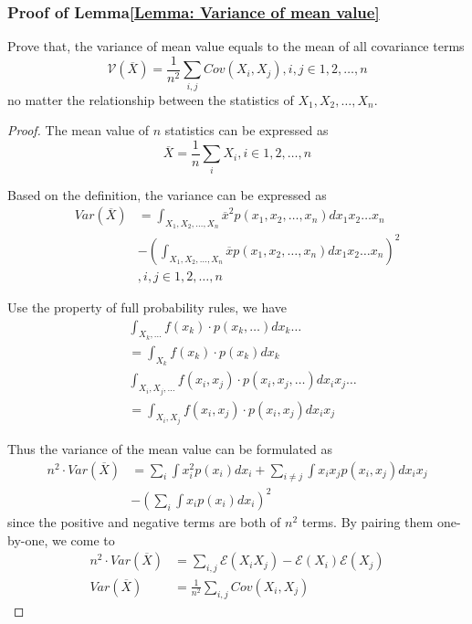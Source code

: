 \documentclass[../main.tex]{subfiles}
\begin{document}
\begin{subappendices}
    \subsubsection{Proof of Lemma\ref{Lemma: Variance of mean value}}
    Prove that, the variance of mean value equals to the mean of all covariance terms
    \begin{equation*}
        \mathcal{V}(\overline{X}) =
        \frac{1}{n^2} \sum_{i, j} Cov(X_i, X_j),
        i, j \in 1, 2, \dots, n
    \end{equation*}
    no matter the relationship between the statistics of $X_1, X_2, \dots, X_n$.

    \begin{proof}
        The mean value of $n$ statistics can be expressed as
        \begin{equation*}
            \overline{X} = \frac{1}{n} \sum_{i} X_i,
            i \in 1, 2, \dots, n
        \end{equation*}

        Based on the definition, the variance can be expressed as
        \begin{align*}
            Var(\overline{X}) & =  \int_{X_1, X_2, \dots, X_n} {\overline{x}}^2 p(x_1, x_2, \dots, x_n) dx_1 x_2 \dots x_n \\
                              & - (\int_{X_1, X_2, \dots, X_n} \overline{x} p(x_1, x_2, \dots, x_n) dx_1 x_2 \dots x_n)^2  \\
                              & , i, j \in 1, 2, \dots, n
        \end{align*}

        Use the property of full probability rules, we have
        \begin{align*}
             & \int_{X_k, \dots} f(x_k) \cdot p(x_k, \dots) dx_k \dots                    \\
             & = \int_{X_k} f(x_k) \cdot p(x_k) dx_k                                      \\
             & \int_{X_i, X_j, \dots} f(x_i, x_j) \cdot p(x_i, x_j, \dots) dx_i x_j \dots \\
             & = \int_{X_i, X_j} f(x_i, x_j) \cdot p(x_i, x_j) dx_i x_j
        \end{align*}

        Thus the variance of the mean value can be formulated as
        \begin{align*}
            n^2 \cdot Var(\overline{X}) & = \sum_i \int x_i^2 p(x_i) dx_i + \sum_{i \neq j} \int x_i x_j p(x_i, x_j) dx_i x_j \\
                                        & - (\sum_i \int x_i p(x_i) dx_i)^2
        \end{align*}
        since the positive and negative terms are both of $n^2$ terms.
        By pairing them one-by-one, we come to
        \begin{align*}
            n^2 \cdot Var(\overline{X}) & = \sum_{i, j} \mathcal{E}(X_i X_j) - \mathcal{E}(X_i)\mathcal{E}(X_j) \\
            Var(\overline{X})           & = \frac{1}{n^2} \sum_{i, j} Cov(X_i, X_j)
        \end{align*}


\end{proof}
\end{subappendices}
\end{document}
